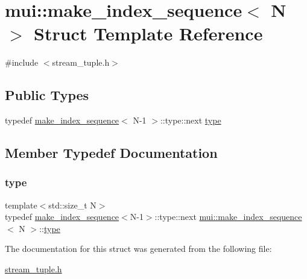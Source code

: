 \hypertarget{structmui_1_1make__index__sequence}{}\section{mui\+:\+:make\+\_\+index\+\_\+sequence$<$ N $>$ Struct Template Reference}
\label{structmui_1_1make__index__sequence}


{\ttfamily \#include $<$stream\+\_\+tuple.\+h$>$}

\subsection*{Public Types}
\begin{DoxyCompactItemize}
\item 
typedef \hyperlink{structmui_1_1make__index__sequence}{make\+\_\+index\+\_\+sequence}$<$ N-\/1 $>$\+::type\+::next \hyperlink{structmui_1_1make__index__sequence_a1beeb221ddf74954f1efe8c9785e1d6d}{type}
\end{DoxyCompactItemize}


\subsection{Member Typedef Documentation}
\mbox{\label{structmui_1_1make__index__sequence_a1beeb221ddf74954f1efe8c9785e1d6d}} 
\subsubsection{\texorpdfstring{type}{type}}
{\footnotesize\ttfamily template$<$std\+::size\+\_\+t N$>$ \\
typedef \hyperlink{structmui_1_1make__index__sequence}{make\+\_\+index\+\_\+sequence}$<$N-\/1$>$\+::type\+::next \hyperlink{structmui_1_1make__index__sequence}{mui\+::make\+\_\+index\+\_\+sequence}$<$ N $>$\+::\hyperlink{structmui_1_1make__index__sequence_a1beeb221ddf74954f1efe8c9785e1d6d}{type}}



The documentation for this struct was generated from the following file\+:\begin{DoxyCompactItemize}
\item 
\hyperlink{stream__tuple_8h}{stream\+\_\+tuple.\+h}\end{DoxyCompactItemize}
